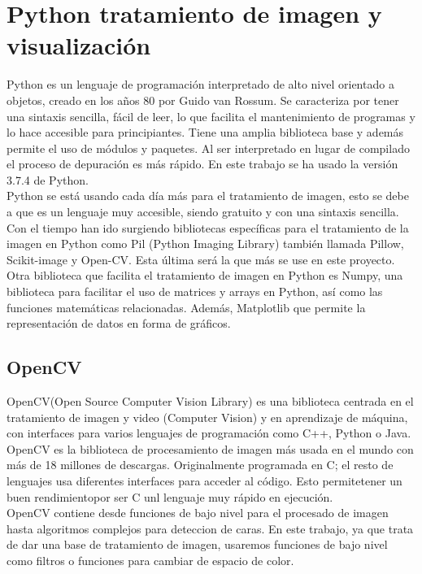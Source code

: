 \documentclass[a4paper,12pt]{report}
\begin{document}
\section{Python tratamiento de imagen y visualización}

Python es un lenguaje de programación interpretado de alto nivel orientado a objetos, creado en los años 80 por Guido van Rossum. Se caracteriza por tener una sintaxis sencilla, fácil de leer, lo que facilita el mantenimiento de programas y lo hace accesible para principiantes. Tiene una amplia biblioteca base y además permite el uso de módulos y paquetes. Al ser interpretado en lugar de compilado el proceso de depuración es más rápido. En este trabajo se ha usado la versión 3.7.4 de Python.\\

 Python se está usando cada día más para el tratamiento de imagen, esto se debe a que es un lenguaje muy accesible, siendo gratuito y con una sintaxis sencilla. Con el tiempo han ido surgiendo bibliotecas específicas para el tratamiento de la imagen en Python como Pil (Python Imaging Library) también llamada Pillow, Scikit-image y Open-CV. Esta última será la que más se use en este proyecto.\\

Otra biblioteca que facilita el tratamiento de imagen en Python es Numpy, una biblioteca para facilitar el uso de matrices y arrays en Python, así como las funciones matemáticas relacionadas.  Además, Matplotlib que permite  la representación de datos en forma de gráficos.

\subsection{OpenCV}

OpenCV(Open Source Computer Vision Library) es una biblioteca centrada en el tratamiento de imagen y video (Computer Vision) y en aprendizaje de máquina, con interfaces para varios lenguajes de programación como C++, Python o Java. OpenCV es la biblioteca de procesamiento de imagen más usada en el mundo con más de 18 millones de descargas. Originalmente programada en C; el resto de lenguajes usa diferentes interfaces para acceder al código. Esto permitetener un buen rendimientopor ser C unl lenguaje muy rápido en ejecución.\\

OpenCV contiene  desde funciones de bajo nivel para el procesado de imagen hasta algoritmos complejos para deteccion de caras. En este trabajo, ya que trata de dar una base de tratamiento de imagen, usaremos funciones de bajo nivel como filtros o funciones para cambiar de espacio de color.\\
\end{document}
